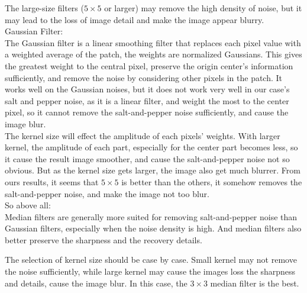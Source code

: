 The large-size filters ($5\times 5$ or larger) may remove the high density of noise, but it may lead to the loss of image detail and make the image appear blurry.\\

Gaussian Filter:\\
The Gaussian filter is a linear smoothing filter that replaces each pixel value with a weighted average of the patch, the weights are normalized Gaussians. This gives the greatest weight to the central pixel, preserve the origin center's information sufficiently, and remove the noise by considering other pixels in the patch.
It works well on the Gaussian noises, but it does not work very well in our case's salt and pepper noise, as it is a linear filter, and weight the most to the center pixel, so it cannot remove the salt-and-pepper noise sufficiently, and cause the image blur.\\

The kernel size will effect the amplitude of each pixels' weights. With larger kernel, the amplitude of each part, especially for the center part becomes less, so it cause the result image smoother, and cause the salt-and-pepper noise not so obvious. 
But as the kernel size gets larger, the image also get much blurrer. From ours results, it seems that $5\times 5$ is better than the others, it somehow removes the salt-and-pepper noise, and make the image not too blur.\\

So above all:\\
Median filters are generally more suited for removing salt-and-pepper noise than Gaussian filters, especially when the noise density is high. And median filters also better preserve the sharpness and the recovery details.

The selection of kernel size should be case by case. Small kernel may not remove the noise sufficiently, while large kernel may cause the images loss the sharpness and details, cause the image blur. In this case, the $3\times 3$ median filter is the best.